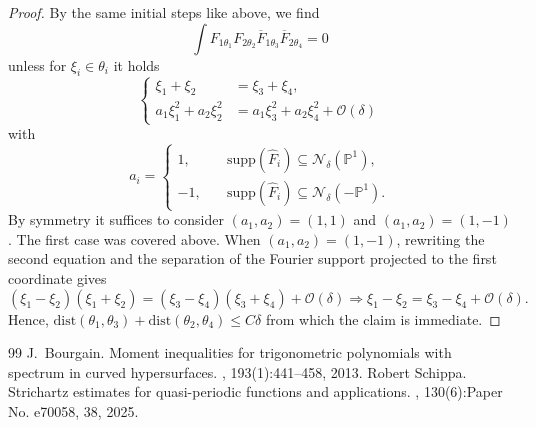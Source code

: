 \documentclass[10pt,a4paper]{amsart}
\begin{document}
\begin{proof}
By the same initial steps like above, we find
\begin{equation*}
\int F_{1 \theta_1} F_{2 \theta_2} \overline{F}_{1 \theta_3} \overline{F}_{2 \theta_4} = 0
\end{equation*}
unless for $\xi_i \in \theta_i$ it holds
\begin{equation*}
\left\{ \begin{array}{cl}
\xi_1 + \xi_2 &= \xi_3 + \xi_4, \\
a_1 \xi_1^2 + a_2 \xi_2^2 &= a_1 \xi_3^2 + a_2 \xi_4^2 + \mathcal{O}(\delta)
\end{array} \right.
\end{equation*}
with
\begin{equation*}
a_i = \begin{cases}
1, &\quad \text{supp}(\hat{F}_i) \subseteq \mathcal{N}_{\delta}(\mathbb{P}^1), \\
-1, &\quad \text{supp}(\hat{F}_i) \subseteq \mathcal{N}_{\delta}(-\mathbb{P}^1).
\end{cases}
\end{equation*}
By symmetry it suffices to consider $(a_1,a_2) = (1,1)$ and $(a_1,a_2) = (1,-1)$. The first case was covered above.
When $(a_1,a_2)=(1,-1)$, rewriting the second equation and the separation of the Fourier support projected to the first coordinate gives
\begin{equation*}
(\xi_1-\xi_2)(\xi_1+\xi_2) = (\xi_3-\xi_4)(\xi_3+\xi_4) + \mathcal{O}(\delta) \Rightarrow \xi_1 - \xi_2 = \xi_3 - \xi_4 + \mathcal{O}(\delta).
\end{equation*}
Hence, $\text{dist}(\theta_1,\theta_3) + \text{dist}(\theta_2,\theta_4) \leq C \delta$ from which the claim is immediate.
\end{proof}


\begin{thebibliography}{99}
 J.~Bourgain. \newblock Moment inequalities for trigonometric polynomials with spectrum in curved hypersurfaces. , 193(1):441--458, 2013.
 Robert Schippa. \newblock Strichartz estimates for quasi-periodic functions and applications. , 130(6):Paper No. e70058, 38, 2025.
\end{thebibliography}
\end{document}

